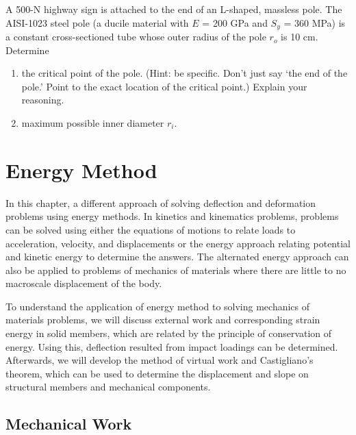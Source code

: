 \documentclass[
10pt,
a4paper,
openany,
svgnames,
]{book} %
\begin{document}
\begin{exercises}
  \exercise A 500-N highway sign is attached to the end of an L-shaped,
  massless pole. The AISI-1023 steel pole (a ducile material with $E$
  = 200 GPa and $S_y$ = 360 MPa) is a constant cross-sectioned tube
  whose outer radius of the pole $r_o$ is 10 cm. Determine
  \begin{enumerate}
  \item the critical point of the pole. (Hint: be specific. Don't just
    say `the end of the pole.' Point to the exact location of the critical
    point.) Explain your reasoning.
  \item maximum possible inner diameter $r_i$.
  \end{enumerate}
  
\end{exercises}


\chapter{Energy Method}

In this chapter, a different approach of solving deflection and deformation problems using energy methods. In kinetics and kinematics problems, problems can be solved using either the equations of motions to relate loads to acceleration, velocity, and displacements or the energy approach relating potential and kinetic energy to determine the answers. The alternated energy approach can also be applied to problems of mechanics of materials where there are little to no macroscale displacement of the body.

To understand the application of energy method to solving mechanics of materials problems, we will discuss external work and corresponding strain energy in solid members, which are related by the principle of conservation of energy. Using this, deflection resulted from impact loadings can be determined. Afterwards, we will develop the method of virtual work and Castigliano's theorem, which can be used to determine the displacement and slope on structural members and mechanical components.

\section{Mechanical Work}
\end{document}
